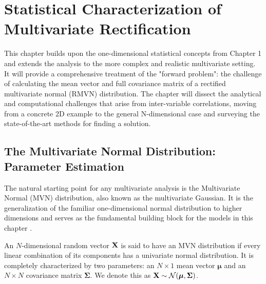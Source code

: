 \ifdefined\ispartofbook
\else
  
  
\fi

\chapter{Statistical Characterization of Multivariate Rectification}
\label{chap:multivariate_stats}


This chapter builds upon the one-dimensional statistical concepts from Chapter 1 and extends the analysis to the more complex and realistic multivariate setting. It will provide a comprehensive treatment of the "forward problem": the challenge of calculating the mean vector and full covariance matrix of a rectified multivariate normal (RMVN) distribution. The chapter will dissect the analytical and computational challenges that arise from inter-variable correlations, moving from a concrete 2D example to the general N-dimensional case and surveying the state-of-the-art methods for finding a solution.

\section{The Multivariate Normal Distribution: Parameter Estimation}
\label{sec:mvn_estimation}

The natural starting point for any multivariate analysis is the Multivariate Normal (MVN) distribution, also known as the multivariate Gaussian. It is the generalization of the familiar one-dimensional normal distribution to higher dimensions and serves as the fundamental building block for the models in this chapter \cite{Bishop2006PatternRecognition}.

An $N$-dimensional random vector $\mathbf{X}$ is said to have an MVN distribution if every linear combination of its components has a univariate normal distribution. It is completely characterized by two parameters: an $N \times 1$ mean vector $\boldsymbol{\mu}$ and an $N \times N$ covariance matrix $\boldsymbol{\Sigma}$. We denote this as $\mathbf{X} \sim \mathcal{N}(\boldsymbol{\mu}, \boldsymbol{\Sigma})$.

